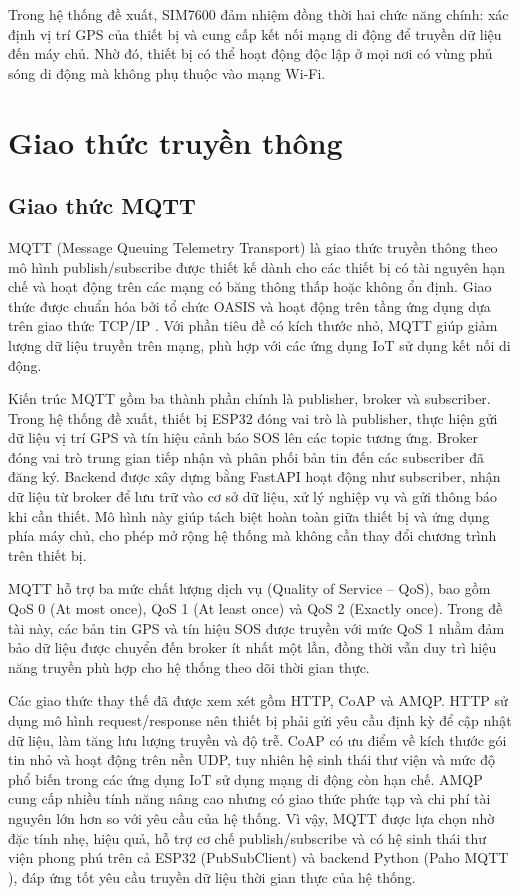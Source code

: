\documentclass[../DoAn.tex]{subfiles}
\begin{document}
Trong hệ thống đề xuất, SIM7600 đảm nhiệm đồng thời hai chức năng chính: xác định vị trí GPS của thiết bị và cung cấp kết nối mạng di động để truyền dữ liệu đến máy chủ. Nhờ đó, thiết bị có thể hoạt động độc lập ở mọi nơi có vùng phủ sóng di động mà không phụ thuộc vào mạng Wi-Fi.

\section{Giao thức truyền thông}
\label{section:3.2}

\subsection{Giao thức MQTT}
\label{subsection:3.2.1}

MQTT (Message Queuing Telemetry Transport) là giao thức truyền thông theo mô hình publish/subscribe được thiết kế dành cho các thiết bị có tài nguyên hạn chế và hoạt động trên các mạng có băng thông thấp hoặc không ổn định. Giao thức được chuẩn hóa bởi tổ chức OASIS và hoạt động trên tầng ứng dụng dựa trên giao thức TCP/IP \cite{mqtt_standard}. Với phần tiêu đề có kích thước nhỏ, MQTT giúp giảm lượng dữ liệu truyền trên mạng, phù hợp với các ứng dụng IoT sử dụng kết nối di động.

Kiến trúc MQTT gồm ba thành phần chính là publisher, broker và subscriber. Trong hệ thống đề xuất, thiết bị ESP32 đóng vai trò là publisher, thực hiện gửi dữ liệu vị trí GPS và tín hiệu cảnh báo SOS lên các topic tương ứng. Broker đóng vai trò trung gian tiếp nhận và phân phối bản tin đến các subscriber đã đăng ký. Backend được xây dựng bằng FastAPI hoạt động như subscriber, nhận dữ liệu từ broker để lưu trữ vào cơ sở dữ liệu, xử lý nghiệp vụ và gửi thông báo khi cần thiết. Mô hình này giúp tách biệt hoàn toàn giữa thiết bị và ứng dụng phía máy chủ, cho phép mở rộng hệ thống mà không cần thay đổi chương trình trên thiết bị.

MQTT hỗ trợ ba mức chất lượng dịch vụ (Quality of Service – QoS), bao gồm QoS 0 (At most once), QoS 1 (At least once) và QoS 2 (Exactly once). Trong đề tài này, các bản tin GPS và tín hiệu SOS được truyền với mức QoS 1 nhằm đảm bảo dữ liệu được chuyển đến broker ít nhất một lần, đồng thời vẫn duy trì hiệu năng truyền phù hợp cho hệ thống theo dõi thời gian thực.

Các giao thức thay thế đã được xem xét gồm HTTP, CoAP và AMQP. HTTP sử dụng mô hình request/response nên thiết bị phải gửi yêu cầu định kỳ để cập nhật dữ liệu, làm tăng lưu lượng truyền và độ trễ. CoAP có ưu điểm về kích thước gói tin nhỏ và hoạt động trên nền UDP, tuy nhiên hệ sinh thái thư viện và mức độ phổ biến trong các ứng dụng IoT sử dụng mạng di động còn hạn chế. AMQP cung cấp nhiều tính năng nâng cao nhưng có giao thức phức tạp và chi phí tài nguyên lớn hơn so với yêu cầu của hệ thống. Vì vậy, MQTT được lựa chọn nhờ đặc tính nhẹ, hiệu quả, hỗ trợ cơ chế publish/subscribe và có hệ sinh thái thư viện phong phú trên cả ESP32 (PubSubClient) và backend Python (Paho MQTT \cite{paho_mqtt}), đáp ứng tốt yêu cầu truyền dữ liệu thời gian thực của hệ thống.
\end{document}
